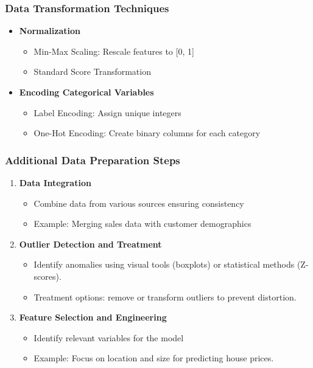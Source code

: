 \documentclass[aspectratio=169]{beamer}
\begin{document}
\begin{frame}[fragile]
    \frametitle{Data Transformation Techniques}
    \begin{itemize}
        \item \textbf{Normalization}
            \begin{itemize}
                \item Min-Max Scaling: Rescale features to [0, 1]
                \item Standard Score Transformation
            \end{itemize}
        \item \textbf{Encoding Categorical Variables}
            \begin{itemize}
                \item Label Encoding: Assign unique integers
                \item One-Hot Encoding: Create binary columns for each category
            \end{itemize}
    \end{itemize}
\end{frame}

\begin{frame}[fragile]
    \frametitle{Additional Data Preparation Steps}
    \begin{enumerate}
        \item \textbf{Data Integration}
            \begin{itemize}
                \item Combine data from various sources ensuring consistency
                \item Example: Merging sales data with customer demographics
            \end{itemize}
        \item \textbf{Outlier Detection and Treatment}
            \begin{itemize}
                \item Identify anomalies using visual tools (boxplots) or statistical methods (Z-scores).
                \item Treatment options: remove or transform outliers to prevent distortion.
            \end{itemize}
        \item \textbf{Feature Selection and Engineering}
            \begin{itemize}
                \item Identify relevant variables for the model
                \item Example: Focus on location and size for predicting house prices.
            \end{itemize}
    \end{enumerate}
\end{frame}
\end{document}
